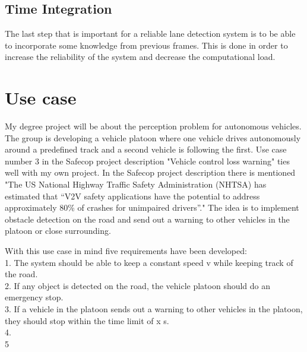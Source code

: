 \subsection{Time Integration}
The last step that is important for a reliable lane detection system is to be able to incorporate some knowledge from previous frames. This is done in order to increase the reliability of the system and decrease the computational load.


\section{Use case}
My degree project will be about the perception problem for autonomous vehicles. The group is developing a vehicle platoon where one vehicle drives autonomously around a predefined track and a second vehicle is following the first. Use case number 3 in the Safecop project description "Vehicle control loss warning" ties well with my own project. In the Safecop project description there is mentioned "The US National Highway Traffic Safety Administration (NHTSA) has estimated that “V2V safety
applications have the potential to address approximately 80\% of crashes for unimpaired drivers”." The idea is to implement obstacle detection on the road and send out a warning to other vehicles in the platoon or close surrounding.

With this use case in mind five requirements have been developed:\\

1. The system should be able to keep a constant speed v while keeping track of the road.\\
2. If any object is detected on the road, the vehicle platoon should do an emergency stop.\\
3. If a vehicle in the platoon sends out a warning to other vehicles in the platoon, they should stop within the time limit of x s. \\
4. \\
5\\

